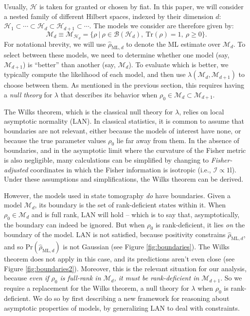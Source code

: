 \documentclass[aps,pra, twocolumn]{revtex4-1}
\newcommand{\M}{\mathcal{M}}
\newcommand{\cH}{\mathcal{H}}
\newcommand{\Id}{\mathbb{I}}
\def\Id{1\!\mathrm{l}}
\newcommand{\rhohat}{\hat{\rho}}
\newcommand{\rhoML}[1]{\rhohat_{\scriptscriptstyle{\mathrm{ML},#1}}}
\begin{document}
Usually, $\cH$ is taken for granted or chosen by fiat.  In this paper, we will consider a nested family of different Hilbert spaces, indexed by their dimension $d$: $\cH_{1}  \subset \cdots \subset \cH_{d} \subset \cH_{d+1} \subset \cdots$.  The models we consider are therefore given by:
\begin{equation}
\label{eq:modelsd}
\M_{d} \equiv \mathcal{M}_{\cH_{d}} = \{\rho~|~\rho \in \mathcal{B}(\mathcal{H}_{d}),~\mathrm{Tr}(\rho) =1,~\rho \geq 0\}.
\end{equation}
For notational brevity, we will use $\rhoML{d}$ to denote the ML estimate over $\M_{d}$. To select between these models, we need to determine whether one model (say, $\M_{d + 1}$) is ``better'' than another (say, $\M_{d}$).  To evaluate which is better, we typically compute the likelihood of each model, and then use $\lambda(\M_{d}, \M_{d+1})$ to choose between them. As mentioned in the previous section, this requires having a \emph{null theory} for $\lambda$ that describes its behavior when $\rho_{0} \in \M_{d} \subset \M_{d + 1}$.

The Wilks theorem, which is the classical null theory for $\lambda$, relies on local asymptotic normality (LAN). In classical statistics, it is common to assume that boundaries are not relevant, either because the models of interest have none, or because the true parameter values $\rho_{0}$ lie far away from them.  In the absence of boundaries, and in the asymptotic limit where the curvature of the Fisher metric is also negligible, many calculations can be simplified by changing to \emph{Fisher-adjusted} coordinates in which the Fisher information is isotropic (i.e., $\mathcal{I}\propto\Id$). Under these assumptions and simplifications, the Wilks theorem can be derived.

However, the models used in state tomography \emph{do} have boundaries. Given a model $\M_{d}$, its boundary is the set of rank-deficient states within it. When $\rho_{0}\in \M_{d}$ and is full rank, LAN will hold -- which is to say that, asymptotically, the boundary can indeed be ignored. But when $\rho_{0}$ is rank-deficient, it lies \emph{on} the boundary of the model.  LAN is not satisfied, because positivity constrains $\rhoML{d}$, and so $\mathrm{Pr}(\rhoML{d})$ is not Gaussian (see Figure \ref{fig:boundaries}). The Wilks theorem does not apply in this case, and its predictions aren't even close (see Figure \ref{fig:boundaries2}). Moreover, this is the relevant situation for our analysis, because \emph{even if $\rho_{0}$ is full-rank in $\M_{d}$, it must be rank-deficient in $\M_{d+1}$}.  So we require a replacement for the Wilks theorem, a null theory for $\lambda$ when $\rho_0$ is rank-deficient. We do so by first describing a new framework for reasoning about asymptotic properties of models, by generalizing LAN to deal with constraints.
\end{document}
